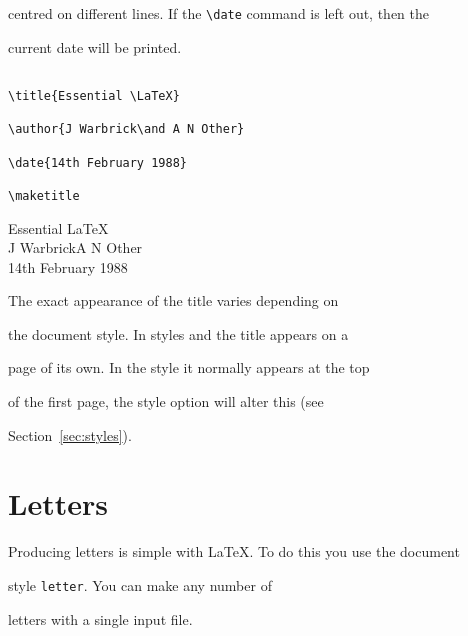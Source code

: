 centred on different lines.  If the \verb|\date| command is left out, then the

current date will be printed.

\egstart

\begin{verbatim}

\title{Essential \LaTeX}

\author{J Warbrick\and A N Other}

\date{14th February 1988}

\maketitle

\end{verbatim}

\egmid

\begin{center}

{\normalsize Essential \LaTeX}\\[4ex]

J Warbrick\hspace{1em}A N Other\\[2ex]

14th February 1988

\end{center}

\egend



The exact appearance of the title varies depending on

the document style.  In styles  and  the title appears on a

page of its own. In the  style it normally appears at the top

of the first page, the style option  will alter this (see

Section~\ref{sec:styles}).



\section{Letters}



Producing letters is simple with \LaTeX{}. To do this you use the document

style {\tt letter}. You can make any number of

letters with a single input file.

